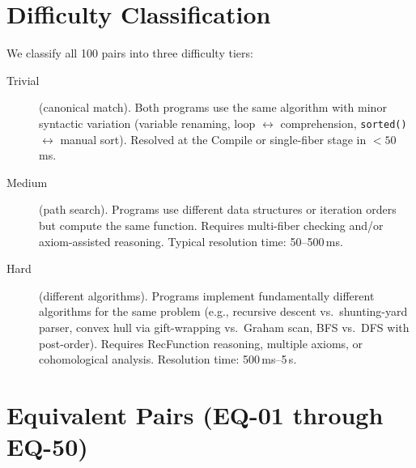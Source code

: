 \section{Difficulty Classification}

We classify all 100 pairs into three difficulty tiers:

\begin{description}
  \item[Trivial] (canonical match).
    Both programs use the same algorithm with minor syntactic
    variation (variable renaming, loop $\leftrightarrow$
    comprehension, \texttt{sorted()} $\leftrightarrow$ manual sort).
    Resolved at the Compile or single-fiber stage in $< 50$\,ms.

  \item[Medium] (path search).
    Programs use different data structures or iteration orders but
    compute the same function.  Requires multi-fiber checking and/or
    axiom-assisted reasoning.  Typical resolution time: 50--500\,ms.

  \item[Hard] (different algorithms).
    Programs implement fundamentally different algorithms for the
    same problem (e.g., recursive descent vs.\ shunting-yard parser,
    convex hull via gift-wrapping vs.\ Graham scan, BFS vs.\ DFS
    with post-order).  Requires RecFunction reasoning, multiple
    axioms, or cohomological analysis.  Resolution time: 500\,ms--5\,s.
\end{description}

\section{Equivalent Pairs (EQ-01 through EQ-50)}

